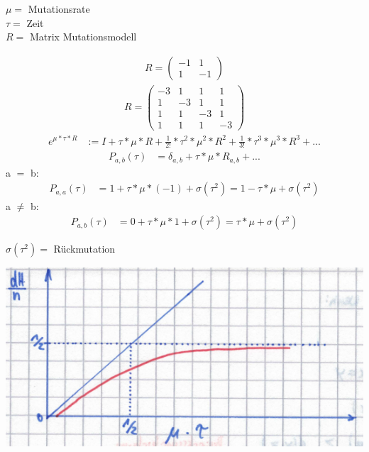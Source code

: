 $\mu = $ Mutationsrate\\
$\tau = $ Zeit\\
$R = $ Matrix Mutationsmodell

\begin{align*}
	R = \begin{pmatrix}
		-1 & 1\\
		 1 &-1
	\end{pmatrix}
\end{align*}
\begin{align*}
	R = \begin{pmatrix}
		-3 & 1 & 1 & 1\\
		 1 &-3 & 1 & 1\\
		 1 & 1 &-3 & 1\\
		 1 & 1 & 1 &-3
	\end{pmatrix}
\end{align*}
\begin{align*}
	e^{\mu * \tau * R} &:= I + \tau * \mu * R + \frac{1}{2!} * \tau^2 * \mu^2 * R^2 + \frac{1}{3!} * \tau^3 * \mu^3 * R^3 + ...
\end{align*}
\begin{align*}
	P_{a,b}(\tau) &= \delta_{a,b} + \tau * \mu * R_{a,b} + ...
\end{align*}
a $=$ b:
\begin{align*}
	P_{a,a}(\tau) &= 1 + \tau * \mu * (-1) + \sigma (\tau ^2) = 1 - \tau * \mu + \sigma (\tau ^2)
\end{align*}
a $\neq$ b:
\begin{align*}
	P_{a,b}(\tau) &= 0 + \tau * \mu * 1 + \sigma (\tau ^2) = \tau * \mu + \sigma (\tau ^2)
\end{align*}

$\sigma (\tau ^2) = $ Rückmutation
 
\begin{center}
	\includegraphics[scale=0.7]{lectures/161209/pix/diagramm}
\end{center}


